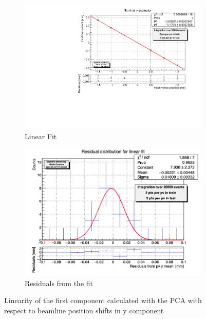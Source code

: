 \begin{figure}
    \centering
    \begin{subfigure}{0.48\textwidth}
    \includegraphics[width=\linewidth]{figures/y_fit.pdf}
    \caption{Linear Fit}\label{fig:yfit_MC}
    \end{subfigure}
    \begin{subfigure}{0.48\textwidth}
    \includegraphics[width=\linewidth]{figures/y_res.png}
    \caption{Residuals from the fit}\label{fig:yres_MC}
    \end{subfigure}
    \caption{Linearity of the first component calculated with the PCA with respect to beamline position shifts in y component}
    \label{fig:y_MC}
\end{figure}


